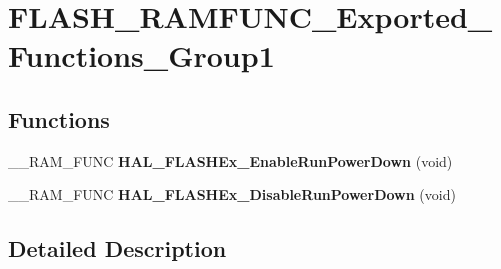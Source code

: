\hypertarget{group___f_l_a_s_h___r_a_m_f_u_n_c___exported___functions___group1}{\section{F\-L\-A\-S\-H\-\_\-\-R\-A\-M\-F\-U\-N\-C\-\_\-\-Exported\-\_\-\-Functions\-\_\-\-Group1}
\label{group___f_l_a_s_h___r_a_m_f_u_n_c___exported___functions___group1}
}
\subsection*{Functions}
\begin{DoxyCompactItemize}
\item 
\hypertarget{group___f_l_a_s_h___r_a_m_f_u_n_c___exported___functions___group1_gaf9b68ea5758273e00142ef09cbb6fad9}{\-\_\-\-\_\-\-R\-A\-M\-\_\-\-F\-U\-N\-C {\bfseries H\-A\-L\-\_\-\-F\-L\-A\-S\-H\-Ex\-\_\-\-Enable\-Run\-Power\-Down} (void)}\label{group___f_l_a_s_h___r_a_m_f_u_n_c___exported___functions___group1_gaf9b68ea5758273e00142ef09cbb6fad9}

\item 
\hypertarget{group___f_l_a_s_h___r_a_m_f_u_n_c___exported___functions___group1_gaeb298555e38ddbe49edf9f1c9d62be47}{\-\_\-\-\_\-\-R\-A\-M\-\_\-\-F\-U\-N\-C {\bfseries H\-A\-L\-\_\-\-F\-L\-A\-S\-H\-Ex\-\_\-\-Disable\-Run\-Power\-Down} (void)}\label{group___f_l_a_s_h___r_a_m_f_u_n_c___exported___functions___group1_gaeb298555e38ddbe49edf9f1c9d62be47}

\end{DoxyCompactItemize}


\subsection{Detailed Description}
